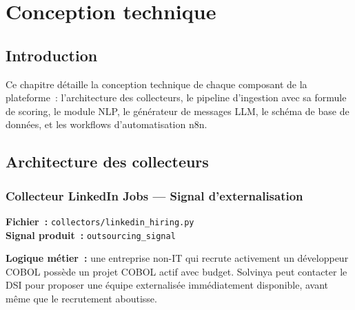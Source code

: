 \chapter{Conception technique}
\setcounter{chapter}{3}
\setcounter{section}{0}
\minitoc
\newpage

\section{Introduction}

Ce chapitre détaille la conception technique de chaque composant de la plateforme~:
l'architecture des collecteurs, le pipeline d'ingestion avec sa formule de scoring,
le module NLP, le générateur de messages LLM, le schéma de base de données, et
les workflows d'automatisation n8n.

\section{Architecture des collecteurs}

\subsection{Collecteur LinkedIn Jobs — Signal d'externalisation}

\textbf{Fichier~:} \texttt{collectors/linkedin\_hiring.py} \\
\textbf{Signal produit~:} \texttt{outsourcing\_signal}

\textbf{Logique métier~:} une entreprise non-IT qui recrute activement un
développeur COBOL possède un projet COBOL actif avec budget. Solvinya peut
contacter le DSI pour proposer une équipe externalisée immédiatement disponible,
avant même que le recrutement aboutisse.

